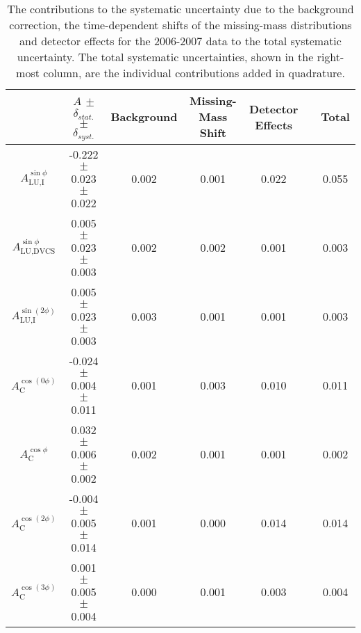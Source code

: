 \begin{table}
 \begin{center}
\resizebox{\textwidth}{!} {
 \begin{tabular}{|c|c|c|c|c|c|c|}
  \hline
 & $A$ $\pm$ $\delta_{stat.}$ $\pm$ $\delta_{syst.}$ & Background & Missing-Mass Shift  & Detector Effects & & Total \\
  \hline
  \hline
  $A_{\textrm{LU,I}}^{\sin\phi}$ & -0.222  $\pm$  0.023  $\pm$   0.022 & 0.002 & 0.001 & 0.022 & & 0.055 \\
  \hline
  $A_{\textrm{LU,DVCS}}^{\sin\phi}$ & 0.005  $\pm$  0.023  $\pm$  0.003 & 0.002 & 0.002 & 0.001 & & 0.003 \\
  \hline
  $A_{\textrm{LU,I}}^{\sin(2\phi)}$ & 0.005  $\pm$  0.023  $\pm$   0.003 & 0.003 & 0.001 & 0.001 & & 0.003 \\
  \hline
  \hline
  $A_{\textrm{C}}^{\cos(0\phi)}$ & -0.024 $\pm$  0.004 $\pm$  0.011 & 0.001 & 0.003 & 0.010 & & 0.011 \\
  \hline
  $A_{\textrm{C}}^{\cos\phi}$ & 0.032  $\pm$  0.006 $\pm$   0.002 & 0.002 & 0.001 & 0.001 & & 0.002 \\
  \hline
  $A_{\textrm{C}}^{\cos(2\phi)}$ & -0.004  $\pm$  0.005  $\pm$   0.014 & 0.001 & 0.000 & 0.014 & & 0.014 \\
  \hline
  $A_{\textrm{C}}^{\cos(3\phi)}$ & 0.001  $\pm$   0.005   $\pm$   0.004 & 0.000 & 0.001 & 0.003 & & 0.004 \\
  \hline
 \end{tabular}
}
  \caption{The contributions to the systematic uncertainty due to the
background correction, the time-dependent shifts of the missing-mass
distributions and detector effects for the 2006-2007 data to the total
systematic uncertainty. The total systematic uncertainties, shown in the
right-most column, are the individual contributions added in quadrature.}
  \label{table_systematic_contributions_0607}
\end{center}
\end{table}

